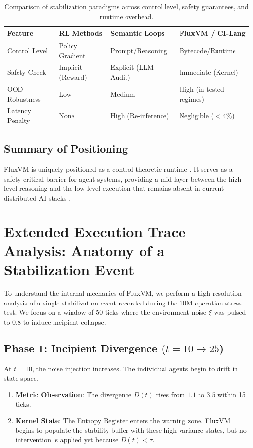 \documentclass{article}
\begin{document}
\begin{table}[h]
\centering
\begin{tabular}{@{}llll@{}}
\toprule
\textbf{Feature} & \textbf{RL Methods} & \textbf{Semantic Loops} & \textbf{FluxVM / CI-Lang} \\ \midrule
Control Level & Policy Gradient & Prompt/Reasoning & Bytecode/Runtime \\
Safety Check & Implicit (Reward) & Explicit (LLM Audit) & Immediate (Kernel) \\
OOD Robustness & Low & Medium & High (in tested regimes) \\
Latency Penalty & None & High (Re-inference) & Negligible ($<4\%$) \\ \bottomrule
\end{tabular}
\caption{Comparison of stabilization paradigms across control level, safety guarantees, and runtime overhead.}
\label{tab:comparison}
\end{table}

\subsection{Summary of Positioning}
FluxVM is uniquely positioned as a control-theoretic runtime \cite{hellerstein2004feedback}. It serves as a safety-critical barrier for agent systems, providing a mid-layer between the high-level reasoning and the low-level execution that remains absent in current distributed AI stacks \cite{tanenbaum2017distributed}.

\newpage

\section{Extended Execution Trace Analysis: Anatomy of a Stabilization Event}
\label{sec:trace_deep_dive}

To understand the internal mechanics of FluxVM, we perform a high-resolution analysis of a single stabilization event recorded during the 10M-operation stress test. We focus on a window of 50 ticks where the environment noise $\xi$ was pulsed to $0.8$ to induce incipient collapse.

\subsection{Phase 1: Incipient Divergence ($t=10 \to 25$)}
At $t=10$, the noise injection increases. The individual agents begin to drift in state space.
\begin{enumerate}
    \item \textbf{Metric Observation}: The divergence $D(t)$ rises from $1.1$ to $3.5$ within 15 ticks.
    \item \textbf{Kernel State}: The Entropy Register enters the warning zone. FluxVM begins to populate the stability buffer with these high-variance states, but no intervention is applied yet because $D(t) < \tau$.
\end{enumerate}
\end{document}
